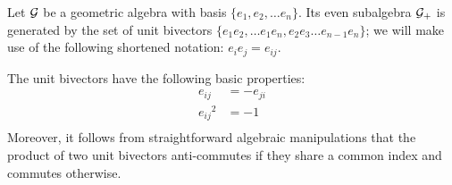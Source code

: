 \begin{lemma}
	Let $\mathcal{G}$ be a geometric algebra with basis $\{e_1, e_2, \ldots e_n\}$.
	Its even subalgebra $\mathcal{G}_+$ is generated by the set of unit bivectors $\{e_1e_2, \ldots e_1e_n, e_2e_3 \ldots e_{n-1}e_n\}$; we will make use of the following shortened notation: $e_ie_j = e_{ij}$.

	The unit bivectors have the following basic properties:
	\begin{align*}
		e_{ij} &= -e_{ji} \\
		{e_{ij}}^2 &= -1 \\
	\end{align*}
	Moreover, it follows from straightforward algebraic manipulations that the product of two unit bivectors anti-commutes if they share a common index and commutes otherwise.
\end{lemma}
